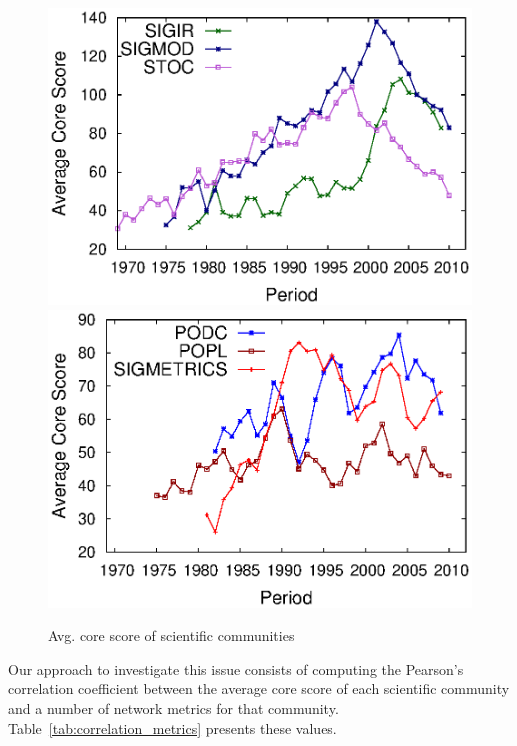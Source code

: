 \documentclass[letterpaper]{www13-companion-accepted}
\begin{document}
\begin{figure}[!htb]
  \begin{center}
    \includegraphics[scale=.325]{graficos/average_core_score/average_core_score_slide_window_grupo_1_temporal_web.eps}
    \includegraphics[scale=.325]{graficos/average_core_score/average_core_score_slide_window_grupo_2_temporal_web.eps}
  \end{center}
  \vspace{-0.5cm}
  \caption{Avg. core score of scientific communities}
  \vspace{-0.5cm}
  \label{fig:average_core_score}
\end{figure}


Our approach to investigate this issue consists of computing the Pearson's correlation coefficient between the average core score of each scientific community and a number of
network metrics for that community. Table~\ref{tab:correlation_metrics} presents these values.
\end{document}

